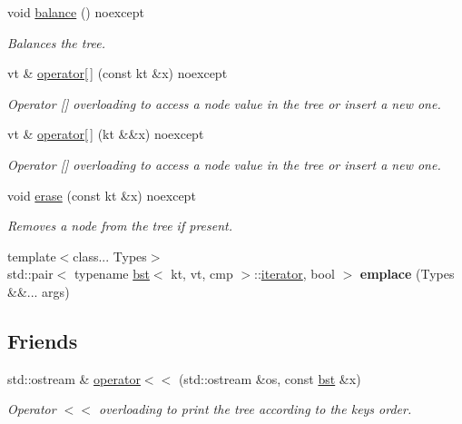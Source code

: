 \begin{DoxyCompactItemize}
void \hyperlink{classbst_a4ac74357616de45d5d3e7cbb9850854e}{balance} () noexcept
\begin{DoxyCompactList}\small\item\em Balances the tree. \end{DoxyCompactList}\item 
vt \& \hyperlink{classbst_ae9b1b8ff05ece0ac05e8dfca244e556e}{operator\mbox{[}$\,$\mbox{]}} (const kt \&x) noexcept
\begin{DoxyCompactList}\small\item\em Operator \mbox{[}\mbox{]} overloading to access a node value in the tree or insert a new one. \end{DoxyCompactList}\item 
vt \& \hyperlink{classbst_a024d828ac753881e50cd7cc93a47a3cc}{operator\mbox{[}$\,$\mbox{]}} (kt \&\&x) noexcept
\begin{DoxyCompactList}\small\item\em Operator \mbox{[}\mbox{]} overloading to access a node value in the tree or insert a new one. \end{DoxyCompactList}\item 
void \hyperlink{classbst_af5ed588b2c686b3b53a2b5466a617f73}{erase} (const kt \&x) noexcept
\begin{DoxyCompactList}\small\item\em Removes a node from the tree if present. \end{DoxyCompactList}\item 
\mbox{\label{classbst_afcc3983e4d16eaa758aec0adb71759bb}} 
{\footnotesize template$<$class... Types$>$ }\\std\+::pair$<$ typename \hyperlink{classbst}{bst}$<$ kt, vt, cmp $>$\+::\hyperlink{classbst_a429b0445783ff6486882db5dee900ce0}{iterator}, bool $>$ {\bfseries emplace} (Types \&\&... args)
\end{DoxyCompactItemize}
\subsection*{Friends}
\begin{DoxyCompactItemize}
\item 
std\+::ostream \& \hyperlink{classbst_ae4b7d69364fca0855f74abdcad674ebf}{operator$<$$<$} (std\+::ostream \&os, const \hyperlink{classbst}{bst} \&x)
\begin{DoxyCompactList}\small\item\em Operator $<$$<$ overloading to print the tree according to the keys order. \end{DoxyCompactList}\end{DoxyCompactItemize}



